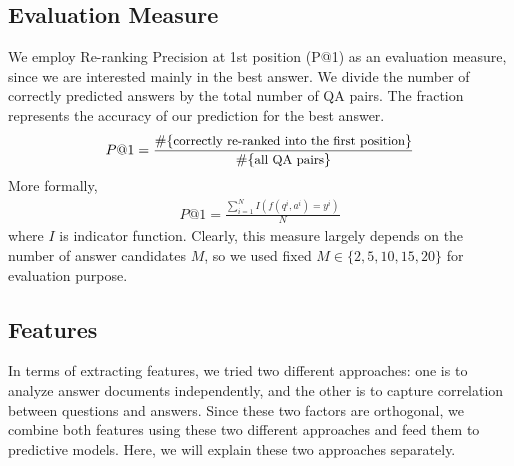 \documentclass[11pt]{article}
\begin{document}
\subsection{Evaluation Measure}
We employ Re-ranking Precision at 1st position (P@1) as an evaluation measure, since we are interested mainly in the best answer. We divide the number of correctly predicted answers by the total number of QA pairs. The fraction represents the accuracy of our prediction for the best answer. 
\begin{eqnarray}
P@1=\frac{\#\{\mbox{\small correctly re-ranked into the first position}\}}{\#\{\mbox{\small all QA pairs}\}} \nonumber
\end{eqnarray}
More formally, 
\begin{eqnarray}
P@1=\frac{\sum_{i=1}^N I(f(q^i, a^i) = y^i)}{N}\nonumber
\end{eqnarray}
where $I$ is indicator function. Clearly, this measure largely depends on the number of answer candidates $M$, so we used fixed $M \in \{2,5,10,15,20\}$ for evaluation purpose.

\subsection{Features}

In terms of extracting features, we tried two different approaches: one is to analyze answer documents independently, and the other is to capture correlation between questions and answers.  Since these two factors are orthogonal, we combine both features using these two different approaches and feed them to predictive models. Here, we will explain these two approaches separately.
\end{document}
